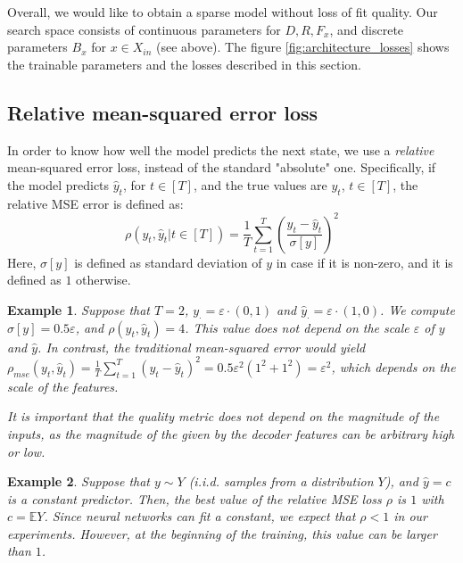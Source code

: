 \documentclass[a4paper,11pt,oneside]{report}
\newtheorem{example}{Example}[section]
\begin{document}
Overall, we would like to obtain a sparse model without loss of fit quality. Our search space consists of continuous parameters for $D,R,F_x$, and discrete parameters $B_x$ for $x\in X_{in}$ (see above). The figure \ref{fig:architecture_losses} shows the trainable parameters and the losses described in this section.

\subsection{Relative mean-squared error loss}
In order to know how well the model predicts the next state, we use a {\em relative} mean-squared error loss, instead of the standard "absolute" one. Specifically, if the model predicts $\hat{y}_t$, for $t\in[T]$, and the true values are $y_t$, $t\in[T]$, the relative MSE error is defined as:
\begin{equation}
\label{eq:rel_mse}
\rho(y_t, \hat{y}_t|t\in[T])=\frac{1}{T}\sum\limits_{t=1}^T\left(\frac{y_t-\hat{y}_t}{\sigma[y]}\right)^2
\end{equation}
Here, $\sigma[y]$ is defined as standard deviation of $y$ in case if it is non-zero, and it is defined as $1$ otherwise.

\begin{example}
    Suppose that $T=2$, $y_{\cdot}=\varepsilon\cdot (0,1)$ and $\hat{y}_{\cdot}=\varepsilon\cdot (1, 0)$. We compute $\sigma[y]=0.5\varepsilon$, and $\rho(y_t,\hat{y}_t)=4$. This value does not depend on the scale $\varepsilon$ of $y$ and $\hat{y}$. In contrast, the traditional mean-squared error would yield $\rho_{mse}(y_t,\hat{y}_t)=\frac{1}{T}\sum\limits_{t=1}^T\left(y_t-\hat{y}_t\right)^2=0.5\varepsilon^2(1^2+1^2)=\varepsilon^2$, which depends on the scale of the features.

    It is important that the quality metric does not depend on the magnitude of the inputs, as the magnitude of the given by the decoder features can be arbitrary high or low.
\end{example}

\begin{example}
    Suppose that $y\sim Y$ (i.i.d. samples from a distribution $Y$), and $\hat{y}=c$ is a constant predictor. Then, the best value of the relative MSE loss $\rho$ is $1$ with $c=\mathbb EY$. Since neural networks can fit a constant, we expect that $\rho<1$ in our experiments. However, at the beginning of the training, this value can be larger than $1$.
\end{example}
\end{document}
